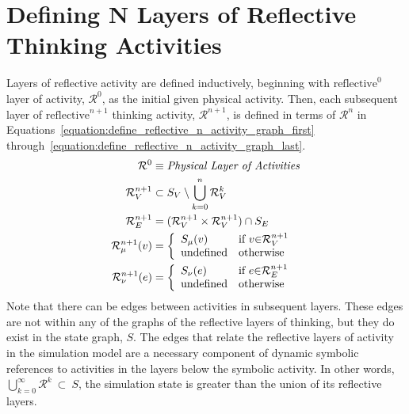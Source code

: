 \section{Defining N Layers of Reflective Thinking Activities}

Layers of reflective activity are defined inductively, beginning with
$\text{reflective}^0$ layer of activity, $\mathcal{R}^0$, as the
initial given physical activity.  Then, each subsequent layer of
$\text{reflective}^{n+1}$ thinking activity, $\mathcal{R}^{n+1}$, is
defined in terms of $\mathcal{R}^n$ in
{\mbox{Equations~\ref{equation:define_reflective_n_activity_graph_first}}}
{\mbox{through~\ref{equation:define_reflective_n_activity_graph_last}}}.
\begin{align}
\label{equation:define_reflective_n_activity_graph_first}
                                        \mathcal{R}^0 &\equiv \text{\emph{Physical Layer of Activities}} \\
                                   \mathcal{R}^{n+1}_V &\subset S_V \setminus \bigcup_{k=0}^n\mathcal{R}^k_V \\
                                   \mathcal{R}^{n+1}_E &= (\mathcal{R}^{n+1}_V \times \mathcal{R}^{n+1}_V) \cap S_E \\
                              \mathcal{R}^{n+1}_\mu(v) &= {\left\{
                                                            \begin{array}{ll}
                                                              S_\mu(v)         & \text{if }v {\in} \mathcal{R}^{n+1}_V \\
                                                              \text{undefined} & \text{otherwise}
                                                            \end{array}
                                                          \right.} \\
\label{equation:define_reflective_n_activity_graph_last}
                              \mathcal{R}^{n+1}_\nu(e) &= {\left\{
                                                            \begin{array}{ll}
                                                              S_\nu(e)          & \text{if }e {\in} \mathcal{R}^{n+1}_E \\
                                                              \text{undefined} & \text{otherwise}
                                                            \end{array}
                                                          \right.}
\end{align}
Note that there can be edges between activities in subsequent layers.
These edges are not within any of the graphs of the reflective layers
of thinking, but they do exist in the state graph, $S$.  The edges
that relate the reflective layers of activity in the simulation model
are a necessary component of dynamic symbolic references to activities
in the layers below the symbolic activity.  In other words,
$\bigcup_{k=0}^\infty\mathcal{R}^k\ \subset\ S$, the simulation state
is greater than the union of its reflective layers.

